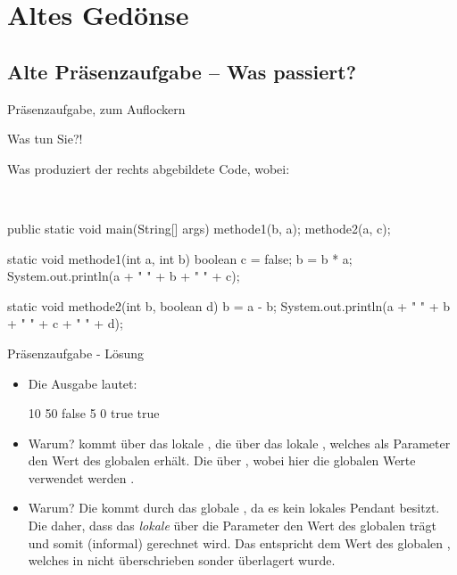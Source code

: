 \iffull
\section{Altes Gedönse}

\subsection{Alte Präsenzaufgabe -- Was passiert?}
\begin{frame}[fragile, c]{Präsenzaufgabe, zum Auflockern}
    \begin{aufgabe}{Was tun Sie?!}
~\\[-\baselineskip]\begin{minipage}{0.475\linewidth}
    \pause{}Was produziert der rechts abgebildete Code, wobei:
\end{minipage}\quad\pause{}\qquad\begin{minipage}{0.5\linewidth}
    ~\begin{plainjava}
public static void main(String[] args) {
    methode1(b, a);
    methode2(a, c);
}

static void methode1(int a, int b) {
    boolean c = false;
    b = b * a;
    System.out.println(a + " " + b + " " + c);
}

static void methode2(int b, boolean d) {
    b = a - b;
    System.out.println(a + " " + b + " " +
                        c + " " + d);
}
\end{plainjava}
\end{minipage}
\end{aufgabe}
\end{frame}

\begin{frame}[t,fragile]{Präsenzaufgabe - Lösung}
    \begin{itemize}[<+(1)->]
        \item Die Ausgabe lautet:\pause{}
\begin{java}[style=lecture@BashOutput]
10 50 false
5 0 true true
\end{java}
        \item Warum?\pause{}  kommt über das lokale ,\pause{} die  über das lokale , welches als Parameter den Wert des globalen  erhält.\pause{} Die  über , wobei hier die globalen Werte verwendet werden\pause{} .
        \item Warum?\pause{}  Die  kommt durch das globale , da es kein lokales Pendant besitzt.\pause{} Die  daher,\pause{} dass das \emph{lokale}  über die Parameter den Wert des globalen  trägt\pause{} und somit (informal)  gerechnet wird.\pause{} Das  entspricht dem Wert des globalen ,\pause{} welches in  nicht überschrieben sonder überlagert wurde.
    \end{itemize}
\end{frame}


